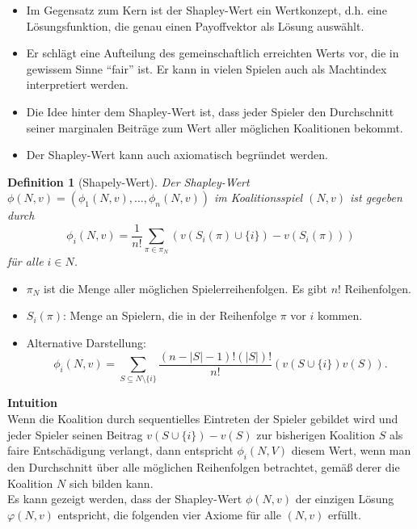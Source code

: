 \documentclass[12pt]{extreport} %
\theoremstyle{named}
\theoremstyle{itshape}
\newtheorem*{definition}{Definition}
\theoremstyle{normal}
\begin{document}
\begin{itemize}
	\item Im Gegensatz zum Kern ist der Shapley-Wert ein Wertkonzept, d.h. eine Lösungsfunktion, die genau einen Payoffvektor als Lösung auswählt.
	\item Er schlägt eine Aufteilung des gemeinschaftlich erreichten Werts vor, die in gewissem Sinne \enquote{fair} ist. Er kann in vielen Spielen auch als Machtindex interpretiert werden.
	\item Die Idee hinter dem Shapley-Wert ist, dass jeder Spieler den Durchschnitt seiner marginalen Beiträge zum Wert aller möglichen Koalitionen bekommt.
	\item Der Shapley-Wert kann auch axiomatisch begründet werden.
\end{itemize}

\begin{definition}[Shapely-Wert]
	Der Shapley-Wert $\phi(N, v) = \left( \phi_1(N,v), \dotsc, \phi_n(N,v) \right)$ im Koalitionsspiel $(N, v)$ ist gegeben durch
	$$ \phi_i(N,v) = \frac{1}{n!} \sum_{\pi \in \pi_N} \left( v\left(S_i(\pi) \cup \{ i \} \right) - v\left(S_i(\pi)\right) \right) $$
	für alle $i \in N$.
\end{definition}

\begin{itemize}
	\item $\pi_N$ ist die Menge aller möglichen Spielerreihenfolgen. Es gibt $n!$ Reihenfolgen.
	\item $S_i(\pi)$: Menge an Spielern, die in der Reihenfolge $\pi$ vor $i$ kommen.
	\item Alternative Darstellung:
		$$ \phi_i(N,v) = \sum_{S \subseteq N \setminus \{ i \}}\frac{\left( n - |S| - 1 \right)!\left(|S|\right)!}{n!} \left( v\left( S \cup \{i\} \right) v(S) \right). $$
\end{itemize}

\textbf{Intuition} ~\\
Wenn die Koalition durch sequentielles Eintreten der Spieler gebildet wird und jeder Spieler seinen Beitrag $v(S \cup \{ i \}) - v(S)$ zur bisherigen Koalition $S$ als faire Entschädigung verlangt, dann entspricht $\phi_i(N, V)$ diesem Wert, wenn man den Durchschnitt über alle möglichen Reihenfolgen betrachtet, gemä{\ss} derer die Koalition $N$ sich bilden kann. ~\\

Es kann gezeigt werden, dass der Shapley-Wert $\phi(N, v)$ der einzigen Lösung $\varphi(N, v)$ entspricht, die folgenden vier Axiome für alle $(N, v)$ erfüllt.
\end{document}
